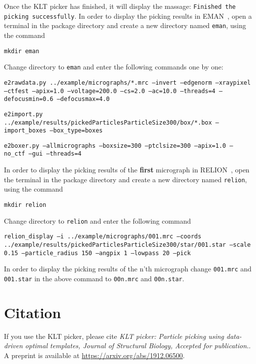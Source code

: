 \documentclass[12pt,a4paper]{article}
\begin{document}
Once the KLT picker has finished, it will display the massage: \texttt{Finished the picking successfully}. In order to display the picking results in EMAN~\cite{eman}, open a terminal in the package directory and create a new directory named \texttt{eman}, using the command
\begin{flushleft}
\texttt{mkdir eman}
\end{flushleft}
Change directory  to \texttt{eman} and enter the following commands one by one:
\begin{flushleft}
	\texttt{e2rawdata.py ../example/micrographs/*.mrc --invert --edgenorm --xraypixel --ctfest --apix=1.0 --voltage=200.0 --cs=2.0 --ac=10.0 --threads=4 --defocusmin=0.6 --defocusmax=4.0}
\end{flushleft}
\begin{flushleft}
	\texttt{e2import.py ../example/results/pickedParticlesParticleSize300/box/*.box --import\_boxes --box\_type=boxes}
\end{flushleft}
\begin{flushleft}
	\texttt{e2boxer.py --allmicrographs --boxsize=300 --ptclsize=300 --apix=1.0 --no\_ctf --gui --threads=4}
\end{flushleft}
 In order to display the picking results of the \textbf{first} micrograph in RELION~\cite{relion}, open the terminal in the package directory and create a new directory named \texttt{relion}, using the command
\begin{flushleft}
\texttt{mkdir relion}
\end{flushleft}
Change directory  to \texttt{relion} and enter the following command
 \begin{flushleft}
 	\texttt{relion\_display --i ../example/micrographs/001.mrc --coords ../example/results/pickedParticlesParticleSize300/star/001.star --scale 0.15 --particle\_radius 150 --angpix 1 --lowpass 20 --pick}
 \end{flushleft}
 In order to display the picking results of the n'th micrograph change   \texttt{001.mrc}  and \texttt{001.star} in the above command to \texttt{00n.mrc} and  \texttt{00n.star}.


\section{Citation}
If you use the KLT picker, please cite \emph{KLT picker: Particle picking using data-driven optimal templates, Journal of Structural Biology, Accepted for publication.}. A preprint is available at \url{https://arxiv.org/abs/1912.06500}.
\end{document}
